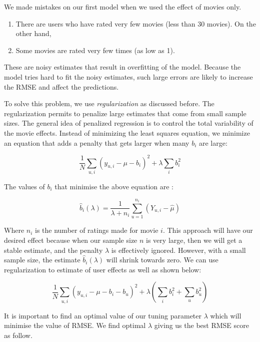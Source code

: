 \documentclass[]{article}
\begin{document}
We made mistakes on our first model when we used the effect of movies
only.

\begin{enumerate}
\item There are users who have rated very few movies (less than 30 movies). On the other hand, 
\item Some movies are rated very few times (as low as 1). 
\end{enumerate}

These are noisy estimates that result in overfitting of the model.
Because the model tries hard to fit the noisy estimates, such large
errors are likely to increase the RMSE and affect the predictions.

To solve this problem, we use \emph{regularization} as discussed before. The regularization
permits to penalize large estimates that come from small sample sizes.
The general idea of penalized regression is to control the total
variability of the movie effects. Instead of minimizing the least
squares equation, we minimize an equation that adds a penalty that gets
larger when many \(b_{i}\) are large:

\begin{equation}
\frac{1}{N} \sum_{u,i} \left(y_{u,i} - \mu - b_i\right)^2 + \lambda \sum_{i} b_i^2
\end{equation}

The values of \(b_{i}\) that minimise the above equation are :

\begin{equation}
\hat{b}_i(\lambda) = \frac{1}{\lambda + n_i} \sum_{u=1}^{n_i} \left(Y_{u,i} - \hat{\mu}\right)
\end{equation}

Where \(n_{i}\) is the number of ratings made for movie \(i\). This
approach will have our desired effect because when our sample size \(n\)
is very large, then we will get a stable estimate, and the penalty
\(\lambda\) is effectively ignored. However, with a small sample size,
the estimate \(\hat{b}_i(\lambda)\) will shrink towards zero. We can use
regularization to estimate of user effects as well as shown below:

\begin{equation}
\frac{1}{N} \sum_{u,i} \left(y_{u,i} - \mu - b_i - b_u \right)^2 + 
\lambda \left(\sum_{i} b_i^2 + \sum_{u} b_u^2\right)
\end{equation}

It is important to find an optimal value of our tuning parameter
\(\lambda\) which will minimise the value of RMSE. We find optimal
\(\lambda\) giving us the best RMSE score as follow.
\end{document}
